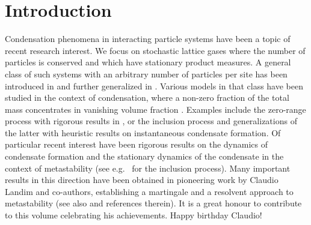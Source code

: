 \documentclass[pdflatex,sn-mathphys-num]{sn-jnl}%
\theoremstyle{thmstyleone}%
\theoremstyle{thmstyletwo}%
\theoremstyle{thmstylethree}%
\begin{document}






\maketitle

\section{Introduction}
\label{sec_introduction}


Condensation phenomena in interacting particle systems have been a topic of recent research interest. We focus on stochastic lattice gases where the number of particles is conserved and which have stationary product measures. A general class of such systems with an arbitrary number of particles per site has been introduced in \cite{bib_C85} and further generalized in \cite{Saada2016}. Various models in that class have been studied in the context of condensation, where a non-zero fraction of the total mass concentrates in vanishing volume fraction \cite{bib_CG13, bib_EW14, bib_G19}. Examples include the zero-range process \cite{bib_DGC98, bib_E00, bib_G03} with rigorous results in \cite{bib_JMP00, bib_GSS03, bib_AL09, bib_AGL13}, or the inclusion process \cite{grosskinsky2011condensation,grosskinsky2013dynamics} and generalizations of the latter \cite{bib_WE12,chau2015explosive} with heuristic results on instantaneous condensate formation. Of particular recent interest have been rigorous results on the dynamics of condensate formation \cite{Jara2025coarsening,beltran2026} and the stationary dynamics of the condensate in the context of metastability (see e.g.\ \cite{dommers,kim2021condensation,kim2025hierarchical} for the inclusion process). Many important results in this direction have been obtained in pioneering work by Claudio Landim and co-authors, establishing a martingale \cite{Landim2015martingale} and a resolvent approach \cite{landim2023resolvent} to metastability (see also \cite{claudiosurvey} and references therein). It is a great honour to contribute to this volume celebrating his achievements. Happy birthday Claudio!\\
\end{document}
